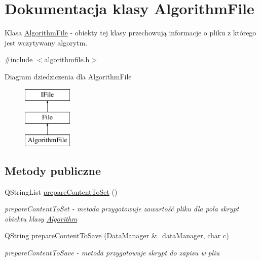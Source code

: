 \hypertarget{class_algorithm_file}{\section{Dokumentacja klasy Algorithm\+File}
\label{class_algorithm_file}
}


Klasa \hyperlink{class_algorithm_file}{Algorithm\+File} -\/ obiekty tej klasy przechowują informacje o pliku z którego jest wczytywany algorytm.  




{\ttfamily \#include $<$algorithmfile.\+h$>$}

Diagram dziedziczenia dla Algorithm\+File\begin{figure}[H]
\begin{center}
\leavevmode
\includegraphics[height=3.000000cm]{class_algorithm_file}
\end{center}
\end{figure}
\subsection*{Metody publiczne}
\begin{DoxyCompactItemize}
\item 
Q\+String\+List \hyperlink{class_algorithm_file_aad65cdb6b287b17fed79d2419a0a38de}{prepare\+Content\+To\+Set} ()
\begin{DoxyCompactList}\small\item\em prepare\+Content\+To\+Set -\/ metoda przygotowuje zawartość pliku dla pola skrypt obiektu klasy \hyperlink{class_algorithm}{Algorithm} \end{DoxyCompactList}\item 
Q\+String \hyperlink{class_algorithm_file_ad61d9a5c9f537b8c0c985fb0810fc6fb}{prepare\+Content\+To\+Save} (\hyperlink{class_data_manager}{Data\+Manager} \&\+\_\+data\+Manager, char c)
\begin{DoxyCompactList}\small\item\em prepare\+Content\+To\+Save -\/ metoda przygotowuje skrypt do zapisu w pliu \end{DoxyCompactList}\end{DoxyCompactItemize}
